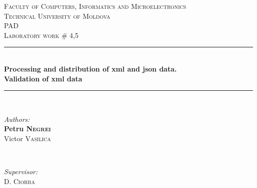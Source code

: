 \documentclass[12pt]{article}
\begin{document}
  \begin{titlepage}

 \newcommand{\HRule}{\rule{\linewidth}{0.5mm}} %
  \begin{center} %

  \textsc{\large Faculty of Computers, Informatics and Microelectronics}\\[0.5cm]
  \textsc{\large Technical University of Moldova}\\[1.2cm] %
  \vspace{35 mm}
  \textsc{\Large PAD}\\[0.5cm] %
  \textsc{\large Laboratory work \# 4,5}\\[0.5cm] %

  \vspace{10 mm}
  \HRule \\[0.4cm]
  { \large \bfseries  Processing and distribution of xml and json data.\\ Validation of xml data}\\[0.4cm] %
  \HRule \\[1.5cm]

      \vspace{25mm}

      \begin{minipage}{0.4\textwidth}
      \begin{flushleft} \large
      \emph{Authors:}\\
      \textbf{Petru \textsc{Negrei}} \\
      Victor \textsc{Vasilica}
      \end{flushleft}
      \end{minipage}
      ~
      \begin{minipage}{0.4\textwidth}
      \begin{flushright} \large
      \emph{Supervisor:} \\
      D. \textsc{Ciorba} %
      \end{flushright}
      \end{minipage}\\[4cm]


\end{center}
\end{titlepage}
\end{document}
